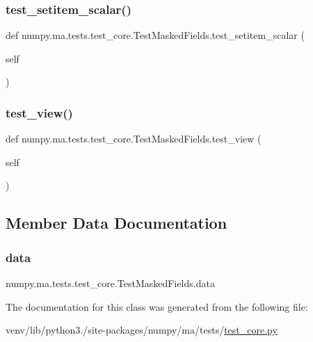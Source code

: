 \subsubsection{\texorpdfstring{test\+\_\+setitem\+\_\+scalar()}{test\_setitem\_scalar()}}
{\footnotesize\ttfamily def numpy.\+ma.\+tests.\+test\+\_\+core.\+Test\+Masked\+Fields.\+test\+\_\+setitem\+\_\+scalar (\begin{DoxyParamCaption}\item[{}]{self }\end{DoxyParamCaption})}

\mbox{\label{classnumpy_1_1ma_1_1tests_1_1test__core_1_1TestMaskedFields_aa7e855336c55c6c1cc7a4b0fe0f7a07b}} 
\subsubsection{\texorpdfstring{test\+\_\+view()}{test\_view()}}
{\footnotesize\ttfamily def numpy.\+ma.\+tests.\+test\+\_\+core.\+Test\+Masked\+Fields.\+test\+\_\+view (\begin{DoxyParamCaption}\item[{}]{self }\end{DoxyParamCaption})}



\subsection{Member Data Documentation}
\mbox{\label{classnumpy_1_1ma_1_1tests_1_1test__core_1_1TestMaskedFields_a7e6630686b0eedd7b0a525ccf190d920}} 
\subsubsection{\texorpdfstring{data}{data}}
{\footnotesize\ttfamily numpy.\+ma.\+tests.\+test\+\_\+core.\+Test\+Masked\+Fields.\+data}



The documentation for this class was generated from the following file\+:\begin{DoxyCompactItemize}
\item 
venv/lib/python3./site-\/packages/numpy/ma/tests/\hyperlink{numpy_2ma_2tests_2test__core_8py}{test\+\_\+core.\+py}\end{DoxyCompactItemize}
